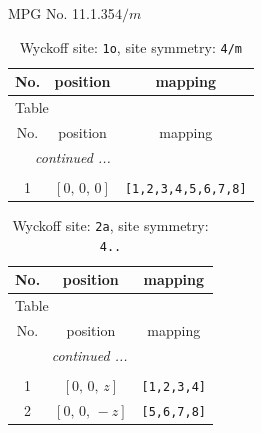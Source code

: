 \documentclass[fleqn,8pt]{jsarticle}
\begin{document}
\setcounter{MaxMatrixCols}{32}

\renewcommand{\tablename}{Table~}
\renewcommand{\figurename}{Figure~}
\begin{center}
\LARGE
MPG No. 11.1.35\quad$4/m$
\end{center}
\renewcommand{\arraystretch}{1.2}
\begin{longtable}{ccc}
\caption{Wyckoff site: {\tt 1o}, site symmetry: {\tt 4/m}}
 \\
 \hline \hline
No. & position & mapping \\ \hline \endfirsthead

\multicolumn{2}{l}{\tablename\ \thetable{}} \\
 \hline \hline
No. & position & mapping \\ \hline \endhead

 \hline \hline
\multicolumn{2}{r}{\footnotesize\it continued ...} \\ \endfoot

 \hline \hline
\multicolumn{2}{r}{} \\ \endlastfoot

1 & $\left[ 0,\, 0,\, 0 \right]$ & {\tt [1,2,3,4,5,6,7,8]} \\
\end{longtable}
\renewcommand{\arraystretch}{1.2}
\begin{longtable}{ccc}
\caption{Wyckoff site: {\tt 2a}, site symmetry: {\tt 4..}}
 \\
 \hline \hline
No. & position & mapping \\ \hline \endfirsthead

\multicolumn{2}{l}{\tablename\ \thetable{}} \\
 \hline \hline
No. & position & mapping \\ \hline \endhead

 \hline \hline
\multicolumn{2}{r}{\footnotesize\it continued ...} \\ \endfoot

 \hline \hline
\multicolumn{2}{r}{} \\ \endlastfoot

1 & $\left[ 0,\, 0,\, z \right]$ & {\tt [1,2,3,4]} \\ \hline
2 & $\left[ 0,\, 0,\, - z \right]$ & {\tt [5,6,7,8]} \\
\end{longtable}
\renewcommand{\arraystretch}{1.2}
\end{document}
